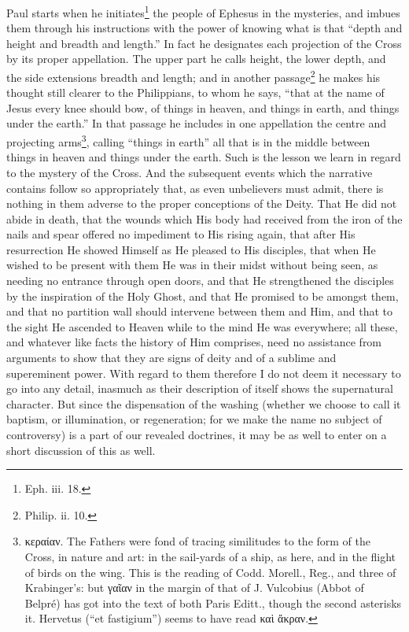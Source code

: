 Paul starts when he initiates\footnote{Eph. iii. 18.} the people of Ephesus in the mysteries, and imbues them through his instructions with the power of knowing what is that “depth and height and breadth and length.” In fact he designates each projection of the Cross by its proper appellation. The upper part he calls height, the lower depth, and the side extensions breadth and length; and in another passage\footnote{Philip. ii. 10.} he makes his thought still clearer to the Philippians, to whom he says, “that at the name of Jesus every knee should bow, of things in heaven, and things in earth, and things under the earth.” In that passage he includes in one appellation the centre and projecting arms\footnote{\textgreek{κεραίαν}. The Fathers were fond of tracing similitudes to the form of the Cross, in nature and art: in the sail-yards of a ship, as here, and in the flight of birds on the wing. This is the reading of Codd. Morell., Reg., and three of Krabinger’s: but \textgreek{γαῖαν} in the margin of that of J. Vulcobius (Abbot of Belpré) has got into the text of both Paris Editt., though the second asterisks it. Hervetus (“et fastigium”) seems to have read \textgreek{καὶ ἄκραν}.}, calling “things in earth” all that is in the middle between things in heaven and things under the earth. Such is the lesson we learn in regard to the mystery of the Cross. And the subsequent events which the narrative contains follow so appropriately that, as even unbelievers must admit, there is nothing in them adverse to the proper conceptions of the Deity. That He did not abide in death, that the wounds which His body had received from the iron of the nails and spear offered no impediment to His rising again, that after His resurrection He showed Himself as He pleased to His disciples, that when He wished to be present with them He was in their midst without being seen, as needing no entrance through open doors, and that He strengthened the disciples by the inspiration of the Holy Ghost, and that He promised to be amongst them, and that no partition wall should intervene between them and Him, and that to the sight He ascended to Heaven while to the mind He was everywhere; all these, and whatever like facts the history of Him comprises, need no assistance from arguments to show that they are signs of deity and of a sublime and supereminent power. With regard to them therefore I do not deem it necessary to go into any detail, inasmuch as their description of itself shows the supernatural character. But since the dispensation of the washing (whether we choose to call it baptism, or illumination, or regeneration; for we make the name no subject of controversy) is a part of our revealed doctrines, it may be as well to enter on a short discussion of this as well.


